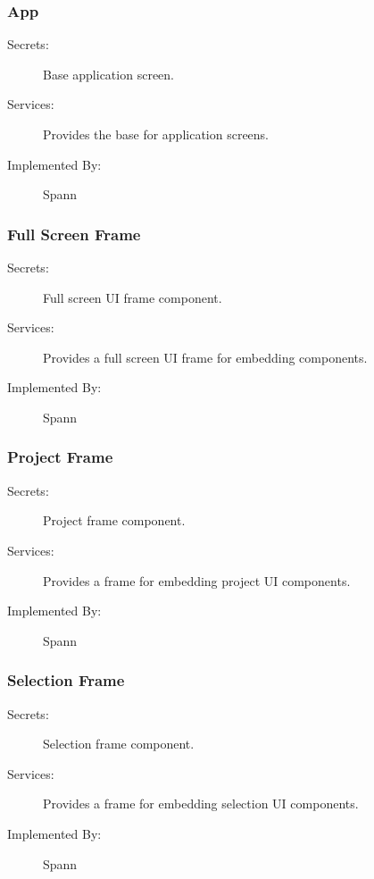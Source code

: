 \documentclass[12pt, titlepage]{article}
\begin{document}
\subsubsection{App}

\begin{description}
\item[Secrets:] Base application screen.
\item[Services:] Provides the base for application screens.
\item[Implemented By:] Spann
\end{description}

\subsubsection{Full Screen Frame}

\begin{description}
\item[Secrets:] Full screen UI frame component.
\item[Services:] Provides a full screen UI frame for embedding components.
\item[Implemented By:] Spann
\end{description}

\subsubsection{Project Frame}

\begin{description}
\item[Secrets:] Project frame component.
\item[Services:] Provides a frame for embedding project UI components.
\item[Implemented By:] Spann
\end{description}

\subsubsection{Selection Frame}

\begin{description}
\item[Secrets:] Selection frame component.
\item[Services:] Provides a frame for embedding selection UI components.
\item[Implemented By:] Spann
\end{description}
\end{document}
